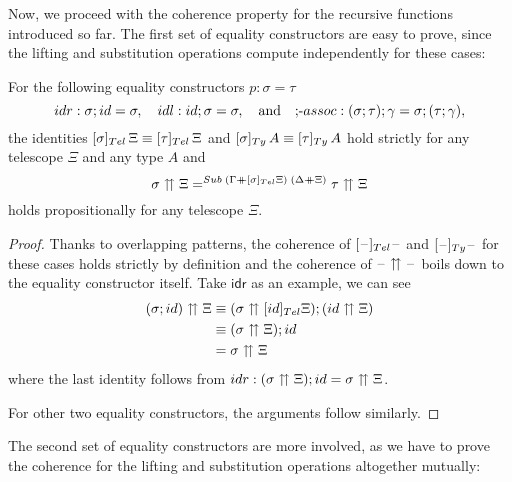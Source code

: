\documentclass[a4paper,UKenglish,numberwithinsect,cleveref,thm-restate]{lipics-v2021}
\newcommand{\danger}{\marginpar[\hfill\dbend]{\dbend\hfill}}
\begin{document}
Now, we proceed with the coherence property for the recursive functions introduced so far.
The first set of equality constructors are easy to prove, since the lifting and substitution operations compute independently for these cases:
\begin{proposition}[Coherence, I]
  \danger
  For the following equality constructors $p : \sigma = \tau$
  \[
    \mathsf{idr} : \sigma;\idS = \sigma, \quad
    \mathsf{idl} : \idS;\sigma = \sigma, \quad\text{and}\quad
    \textnormal{;-}\mathsf{assoc} : (\sigma;\tau);\gamma = \sigma; (\tau; \gamma), 
  \]
  the identities $[\sigma]_{\Tel}\,\Xi \judgeq [\tau]_{\Tel}\,\Xi$ and $[\sigma ]_{\Ty}\,A \judgeq [\tau ]_{\Ty}\,A$
  hold strictly for any telescope $\Xi$ and any type $A$ and
  \[
    \sigma \upuparrows \Xi =^{\Sub\;(\Gamma\dplus [\sigma]_{\Tel}\Xi)\;(\Delta\dplus\Xi)}
    \tau   \upuparrows \Xi
  \]
  holds propositionally for any telescope $\Xi$.
\end{proposition}
\begin{proof}
  Thanks to overlapping patterns, the coherence of $[\blank]_{\Tel}\blank$ and $[\blank]_{\Ty}\blank$ for these cases holds strictly by definition and the coherence of $\mathord{\hspace{1pt}\text{--}\hspace{1pt}} \upuparrows \mathord{\hspace{1pt}\text{--}\hspace{1pt}}$ boils down to the equality constructor itself.
  Take $\mathsf{idr}$ as an example, we can see 
  \begin{align*}
    (\sigma; \idS) \upuparrows \Xi & \judgeq (\sigma \upuparrows [\idS]_{\Tel} \Xi) ; (\idS \upuparrows \Xi) \\
                                   & \judgeq (\sigma \upuparrows \Xi) ; \idS \\
                                   & = \sigma \upuparrows \Xi
  \end{align*}
  where the last identity follows from $\mathsf{idr}:(\sigma \upuparrows \Xi) ; \idS = \sigma \upuparrows \Xi$.

  For other two equality constructors, the arguments follow similarly.
\end{proof}
The second set of equality constructors are more involved, as we have to prove the coherence for the lifting and substitution operations altogether mutually:
\end{document}
